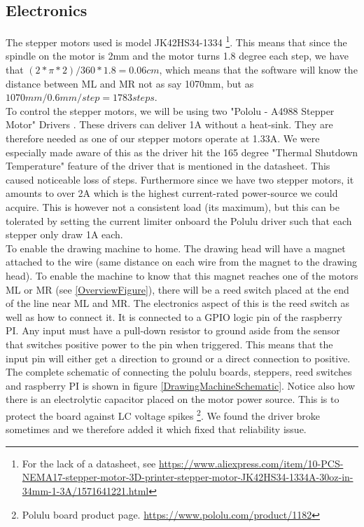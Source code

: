 \subsection{Electronics}
The stepper motors used is model JK42HS34-1334 \footnote{For the lack of a datasheet, see \url{https://www.aliexpress.com/item/10-PCS-NEMA17-stepper-motor-3D-printer-stepper-motor-JK42HS34-1334A-30oz-in-34mm-1-3A/1571641221.html}}. This means that since the spindle on the motor is 2mm and the motor turns 1.8 degree each step, we have that $ (2*\pi*2)/360*1.8 = 0.06cm $, which means that the software will know the distance between ML and MR not as say 1070mm, but as $ 1070mm/0.6mm/step = 1783 steps $.\\
To control the stepper motors, we will be using two 
"Pololu - A4988 Stepper Motor" Drivers \citep{Pololu:StepperDriver}. These drivers can deliver 1A without a heat-sink. They are therefore needed as one of our stepper motors operate at 1.33A. We were especially made aware of this as the driver hit the 165 degree "Thermal Shutdown Temperature" feature of the driver that is mentioned in the datasheet. This caused noticeable loss of steps. Furthermore since we have two stepper motors, it amounts to over 2A which is the highest current-rated power-source we could acquire. This is however not a consistent load (its maximum), but this can be tolerated by setting the current limiter onboard the Polulu driver such that each stepper only draw 1A each.\\ 
To enable the drawing machine to home. The drawing head will have a magnet attached to the wire (same distance on each wire from the magnet to the drawing head). To enable the machine to know that this magnet reaches one of the motors ML or MR (see \ref{OverviewFigure}), there will be a reed switch placed at the end of the line near ML and MR. The electronics aspect of this is the reed switch as well as how to connect it. It is connected to a GPIO logic pin of the raspberry PI. Any input must have a pull-down resistor to ground aside from the sensor that switches positive power to the pin when triggered. This means that the input pin will either get a direction to ground or a direct connection to positive.\\
The complete schematic of connecting the polulu boards, steppers, reed switches and raspberry PI is shown in figure \ref{DrawingMachineSchematic}. Notice also how there is an electrolytic capacitor placed on the motor power source. This is to protect the board against LC voltage spikes \footnote{Polulu board product page. \url{https://www.pololu.com/product/1182}}. We found the driver broke sometimes and we therefore added it which fixed that reliability issue.  \\

